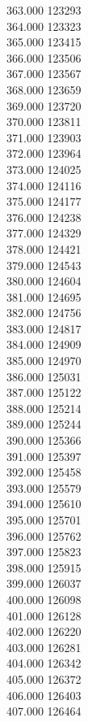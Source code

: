 { 363.000	123293 \\
 364.000	123323 \\
 365.000	123415 \\
 366.000	123506 \\
 367.000	123567 \\
 368.000	123659 \\
 369.000	123720 \\
 370.000	123811 \\
 371.000	123903 \\
 372.000	123964 \\
 373.000	124025 \\
 374.000	124116 \\
 375.000	124177 \\
 376.000	124238 \\
 377.000	124329 \\
 378.000	124421 \\
 379.000	124543 \\
 380.000	124604 \\
 381.000	124695 \\
 382.000	124756 \\
 383.000	124817 \\
 384.000	124909 \\
 385.000	124970 \\
 386.000	125031 \\
 387.000	125122 \\
 388.000	125214 \\
 389.000	125244 \\
 390.000	125366 \\
 391.000	125397 \\
 392.000	125458 \\
 393.000	125579 \\
 394.000	125610 \\
 395.000	125701 \\
 396.000	125762 \\
 397.000	125823 \\
 398.000	125915 \\
 399.000	126037 \\
 400.000	126098 \\
 401.000	126128 \\
 402.000	126220 \\
 403.000	126281 \\
 404.000	126342 \\
 405.000	126372 \\
 406.000	126403 \\
 407.000	126464 \\
}

